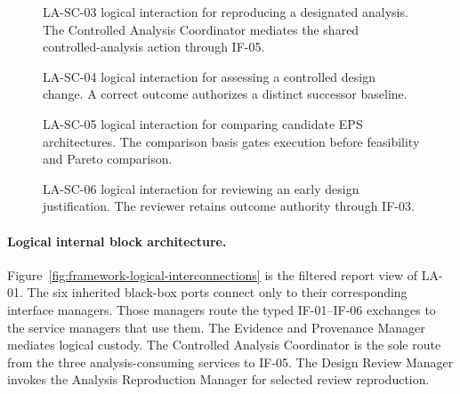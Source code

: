 \documentclass[11pt,a4paper]{article}
\begin{document}
\begin{figure}[H]
    \centering
    \resizebox{\linewidth}{!}{}
    \caption{LA-SC-03 logical interaction for reproducing a designated analysis. The Controlled Analysis Coordinator mediates the shared controlled-analysis action through IF-05.}
    \label{fig:logical-scenario-reproduce-analysis}
\end{figure}

\begin{figure}[H]
    \centering
    \resizebox{\linewidth}{!}{}
    \caption{LA-SC-04 logical interaction for assessing a controlled design change. A correct outcome authorizes a distinct successor baseline.}
    \label{fig:logical-scenario-assess-change}
\end{figure}

\begin{figure}[H]
    \centering
    \resizebox{\linewidth}{!}{}
    \caption{LA-SC-05 logical interaction for comparing candidate EPS architectures. The comparison basis gates execution before feasibility and Pareto comparison.}
    \label{fig:logical-scenario-compare-eps-architectures}
\end{figure}

\begin{figure}[H]
    \centering
    \resizebox{\linewidth}{!}{}
    \caption{LA-SC-06 logical interaction for reviewing an early design justification. The reviewer retains outcome authority through IF-03.}
    \label{fig:logical-scenario-review-justification}
\end{figure}

\paragraph{Logical internal block architecture.}
Figure~\ref{fig:framework-logical-interconnections} is the filtered report view of LA-01. The six inherited black-box ports connect only to their corresponding interface managers. Those managers route the typed IF-01--IF-06 exchanges to the service managers that use them. The Evidence and Provenance Manager mediates logical custody. The Controlled Analysis Coordinator is the sole route from the three analysis-consuming services to IF-05. The Design Review Manager invokes the Analysis Reproduction Manager for selected review reproduction.
\end{document}
